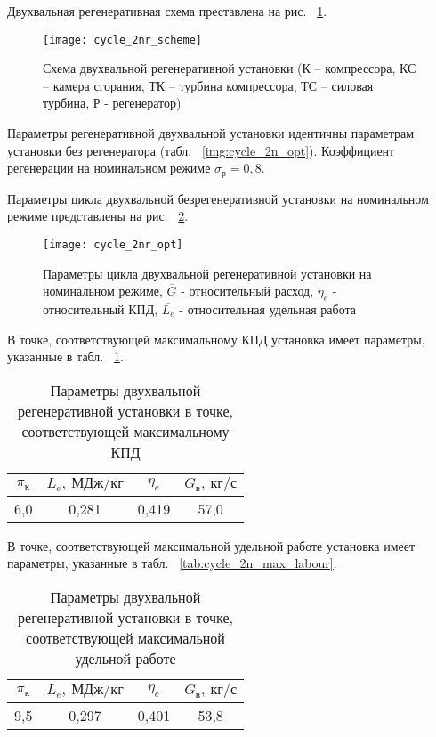 Двухвальная регенеративная схема преставлена на рис. ~\ref{img:cycle_2nr_scheme}.

\begin{figure}[H]
    \centering
    \texttt{[image: cycle\_2nr\_scheme]}
    \caption{Схема двухвальной регенеративной установки (К – компрессора, КС – камера сгорания, ТК – турбина компрессора, ТС – силовая турбина, Р - регенератор)}
    \label{img:cycle_2nr_scheme}
\end{figure}

Параметры регенеративной двухвальной установки идентичны параметрам установки без регенератора (табл. ~\ref{img:cycle_2n_opt}). Коэффициент регенерации на номинальном режиме $\sigma_р = 0,8$.

Параметры цикла двухвальной безрегенеративной установки на номинальном режиме представлены на рис. ~\ref{img:cycle_2nr_opt}.

\begin{figure}[H]
    \centering
    \texttt{[image: cycle\_2nr\_opt]}
    \caption{Параметры цикла двухвальной регенеративной установки на номинальном режиме,
	$\overline{G}$ - относительный расход, $\overline{\eta_e}$ - относительный КПД, $\overline{L_e}$ - относительная удельная работа}
    \label{img:cycle_2nr_opt}
\end{figure}

В точке, соответствующей максимальному КПД установка имеет параметры, указанные в табл. ~\ref{tab:cycle_2nr_max_eta}.

\begin{longtable}{|c|c|c|c|}
	\caption{Параметры двухвальной регенеративной установки в точке, соответствующей максимальному КПД} 
	\label{tab:cycle_2nr_max_eta}
	\hline
	\textbf{$\pi_к$} & \textbf{$L_e, \ МДж/кг$} & \textbf{$\eta_e$} & \textbf{$G_в, \ кг/с$} \\ \hline
	6,0 & 0,281 & 0,419 & 57,0 \\ \hline
\end{longtable}


В точке, соответствующей максимальной удельной работе установка имеет параметры, указанные в табл. ~\ref{tab:cycle_2n_max_labour}.
\begin{longtable}{|c|c|c|c|}
	\caption{Параметры двухвальной регенеративной установки в точке, соответствующей максимальной удельной работе} 
	\label{tab:cycle_2nr_max_labour}
	\hline
	\textbf{$\pi_к$} & \textbf{$L_e, \ МДж/кг$} & \textbf{$\eta_e$} & \textbf{$G_в, \ кг/с$} \\ \hline
	9,5 & 0,297 & 0,401 & 53,8 \\ \hline
\end{longtable}

